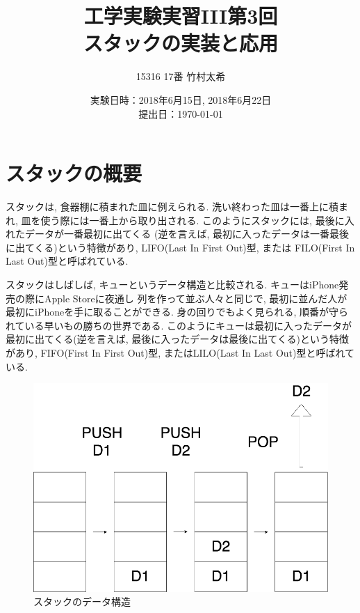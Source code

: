 \documentclass[a4j]{jsarticle}
\title {工学実験実習III第3回\\スタックの実装と応用}
\author {15316 17番 竹村太希}
\date{実験日時：2018年6月15日, 2018年6月22日
\\ 提出日：\today}
\begin{document}
\maketitle
\thispagestyle{empty}
\newpage
\setcounter{page}{1}
\pagestyle{plain}

\section{スタックの概要}
    スタックは, 食器棚に積まれた皿に例えられる. 洗い終わった皿は一番上に積まれ, 
    皿を使う際には一番上から取り出される.  
    このようにスタックには, 最後に入れたデータが一番最初に出てくる
    (逆を言えば, 最初に入ったデータは一番最後に出てくる)という特徴があり, LIFO(Last In First Out)型, または
    FILO(First In Last Out)型と呼ばれている. 

    スタックはしばしば, キューというデータ構造と比較される. キューはiPhone発売の際にApple Storeに夜通し
    列を作って並ぶ人々と同じで, 最初に並んだ人が最初にiPhoneを手に取ることができる. 
    身の回りでもよく見られる, 順番が守られている早いもの勝ちの世界である. 
    このようにキューは最初に入ったデータが最初に出てくる(逆を言えば, 最後に入ったデータは最後に出てくる)という特徴があり, 
    FIFO(First In First Out)型, またはLILO(Last In Last Out)型と呼ばれている. 
    
    \begin{figure}[H]
        \centering
        \includegraphics[scale=0.3]{stack.png}
        \caption{スタックのデータ構造}
        \label{stack}
    \end{figure}
\end{document}
